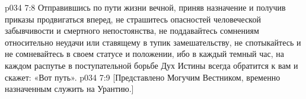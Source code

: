 \vs p034 7:8 \pc Отправившись по пути жизни вечной, приняв назначение и получив приказы продвигаться вперед, не страшитесь опасностей человеческой забывчивости и смертного непостоянства, не поддавайтесь сомнениям относительно неудачи или ставящему в тупик замешательству, не спотыкайтесь и не сомневайтесь в своем статусе и положении, ибо в каждый темный час, на каждом распутье в поступательной борьбе Дух Истины всегда обратится к вам и скажет: «Вот путь».
\vsetoff
\vs p034 7:9 [Представлено Могучим Вестником, временно назначенным служить на Урантию.]
